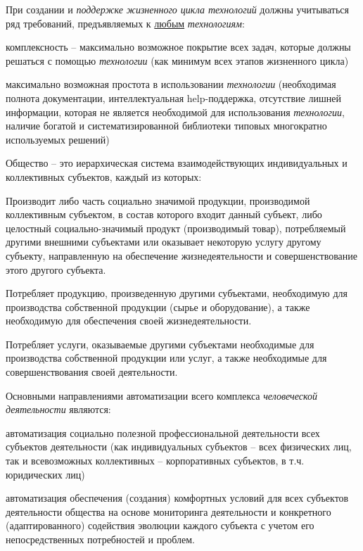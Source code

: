 При создании и \textit{поддержке жизненного цикла технологий} должны учитываться ряд требований, предъявляемых к \underline{любым} \textit{технологиям}:

\begin{textitemize}
	\item
	комплексность -- максимально возможное покрытие всех задач, которые должны решаться с помощью \textit{технологии} (как минимум всех этапов жизненного цикла)
	\item
	максимально возможная простота в использовании \textit{технологии} (необходимая полнота документации, интеллектуальная help-поддержка, отсутствие лишней информации, которая не является необходимой для использования \textit{технологии}, наличие богатой и систематизированной библиотеки типовых многократно используемых решений)
\end{textitemize}

Общество -- это иерархическая система взаимодействующих индивидуальных и коллективных субъектов, каждый из которых:

\begin{textitemize}
	\item
	Производит либо часть социально значимой продукции, производимой коллективным субъектом, в состав которого входит данный субъект, либо целостный социально-значимый продукт (производимый товар), потребляемый другими внешними субъектами или оказывает некоторую услугу другому субъекту, направленную на обеспечение жизнедеятельности и совершенствование этого другого субъекта.
	\item
	Потребляет продукцию, произведенную другими субъектами, необходимую для производства собственной продукции (сырье и оборудование), а также необходимую для обеспечения своей жизнедеятельности.
	\item
	Потребляет услуги, оказываемые другими субъектами необходимые для производства собственной продукции или услуг, а также необходимые для совершенствования своей деятельности.
\end{textitemize}

Основными направлениями автоматизации всего комплекса \textit{человеческой деятельности} являются:

\begin{textitemize}
	\item
	
	автоматизация социально полезной профессиональной деятельности всех субъектов деятельности (как индивидуальных субъектов -- всех физических лиц, так и всевозможных коллективных -- корпоративных субъектов, в т.ч. юридических лиц)
	
	\item
	
	автоматизация обеспечения (создания) комфортных условий для всех субъектов деятельности общества на основе мониторинга деятельности и конкретного (адаптированного) содействия эволюции каждого субъекта с учетом его непосредственных потребностей и проблем.
	
\end{textitemize}

